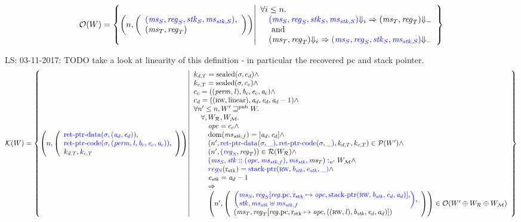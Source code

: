 \documentclass[a3paper]{article}
\newcommand\lau[1]{{\color{purple} \sf \footnotesize {LS: #1}}\\}
\newcommand{\dom}{\mathrm{dom}}
\newcommand{\npair}[2][n]{\left(#1,#2\right)}
\newcommand{\tand}{\text{ and }}
\newcommand{\typesetlr}[1]{\mathcal{#1}}
\newcommand{\lrk}{\typesetlr{K}}
\newcommand{\lrr}{\typesetlr{R}}
\newcommand{\lro}{\typesetlr{O}}
\newcommand{\lrp}{\typesetlr{P}}
\newcommand{\lrm}{\typesetlr{M}}
\newcommand{\stpair}[3][]{
\ifthenelse{\equal{#1}{}}
{\left(\src{#2_S},#3_T\right)}
{\left(\src{#2},#3\right)}}
\newcommand{\memSat}[3][n]{#2 :_{#1}#3}
\newcommand{\future}{\sqsupseteq}
\newcommand{\pub}{\mathrm{pub}}
\newcommand{\pubft}{\future^{\pub}}
\newcommand{\sourcecolor}{\color{blue}}
\newcommand{\src}[1]{{\sourcecolor #1}}
\newcommand{\update}[2]{[#1 \mapsto #2]}
\newcommand{\updReg}[2]{\update{\reg.#1}{#2}}
\newcommand{\shareddom}[1]{\mathrm{#1}}
\newcommand{\perm}{\var{perm}}
\newcommand{\lin}{\var{l}}
\newcommand{\stkptr}[1]{\mathrm{stack\text{-}ptr}(#1)}
\newcommand{\retptrd}{\mathrm{ret\text{-}ptr\text{-}data}}
\newcommand{\retptrc}{\mathrm{ret\text{-}ptr\text{-}code}}
\newcommand{\sealed}[1]{\shareddom{sealed}(#1)}
\newcommand{\term}[1][-]{{\Downarrow_{#1}}}
\newcommand{\var}[1]{\mathit{#1}}
\newcommand{\reg}{\var{reg}}
\newcommand{\ms}{\var{ms}}
\newcommand{\stk}{\var{stk}}
\newcommand{\opc}{\var{opc}}
\newcommand{\baddr}{\var{b}}
\newcommand{\eaddr}{\var{e}}
\newcommand{\aaddr}{\var{a}}
\newcommand{\pcreg}{\mathrm{pc}}
\newcommand{\rstk}{\mathrm{r}_\mathrm{stk}}
\newcommand{\plainlinearity}[1]{\mathrm{#1}}
\newcommand{\linear}{\plainlinearity{linear}}
\newcommand{\plainperm}[1]{\textsc{#1}}
\newcommand{\rw}{\plainperm{rw}}
\begin{document}
\[
  \lro(W) = \left\{ \npair{\left(\array{l}\src{(\ms_S,\reg_S,\stk_S,\ms_{\stk,S})},\\(\ms_T,\reg_T)\endarray\right)} \middle|
    \begin{array}{l}
      \forall i \leq n \ldotp \\
      \quad \src{(\ms_S,\reg_S,\stk_S,\ms_{\stk,S})} \term[i] \Rightarrow (\ms_T,\reg_T) \term\\
      \quad \tand\\
      \quad (\ms_T,\reg_T) \term[i] \Rightarrow \src{(\ms_S,\reg_S,\stk_S,\ms_{\stk,S})} \term
    \end{array}
\right\}
\]


\lau{03-11-2017: TODO take a look at linearity of this definition - in particular the recovered pc and stack pointer.}
\[
  \lrk(W) = \left\{ \npair{\left(\array{l}\src{\retptrd(\sigma,(\aaddr_d,\eaddr_d))},\\\src{\retptrc(\sigma,(\perm,\lin,\baddr_c,\eaddr_c,\aaddr_c))},\\k_{d,T},k_{c,T}\endarray\right)} \middle|
    \begin{array}{l}
      k_{d,T} = \sealed{\sigma,c_d} \wedge\\
      k_{c,T} = \sealed{\sigma,c_c} \wedge\\
      c_c = ((\perm,\lin),\baddr_c,\eaddr_c,\aaddr_c) \wedge\\
      c_d = ((\rw,\linear),\aaddr_d,\eaddr_d,\aaddr_d-1) \wedge\\
      \forall n' \leq n, W' \pubft W \ldotp \\
      \quad \forall, W_\lrr, W_\lrm \ldotp  \\
      \qquad\opc = c_c \wedge\\
      \qquad\dom(\ms_{\stk,f}) = [\aaddr_d,\eaddr_d] \wedge\\
      \qquad\npair[n']{\src{\retptrd(\sigma,\_)},\src{\retptrc(\sigma,\_)},k_{d,T},k_{c,T}} \in \lrp(W') \wedge \\
      \qquad\npair[n']{\stpair{\reg}{\reg}} \in \lrr(W_\lrr) \wedge\\
      \qquad\memSat[n']{\stpair[.]{\ms_S,\stk::(\opc,\ms_{\stk,f}),\ms_\stk}{\ms_T}}{W_\lrm} \wedge \\
      \qquad\src{reg_S}(\rstk) = \src{\stkptr{\rw,\baddr_\stk,\eaddr_\stk,\_}} \wedge \\
      \qquad\eaddr_\stk = \aaddr_d-1\\
      \qquad\Rightarrow\\
      \qquad\npair[n']{\left(\array{l}\src{\left(\arraycolsep=0pt\array{l}\ms_S,\reg_S\updReg{\pcreg,\rstk}{\opc,\stkptr{\rw,\baddr_\stk,\eaddr_d,\aaddr_d}},\\\stk, \ms_\stk \uplus \ms_{\stk,f}\endarray\right)},\\
                                          (\ms_T,\reg_T\updReg{\pcreg,\rstk}{\opc,((\rw,\lin),\baddr_\stk,\eaddr_d,\aaddr_d)})\endarray\right)}
      \in \lro(W' \oplus W_\lrr \oplus W_\lrm)
    \end{array}
  \right\}
\]
\end{document}
